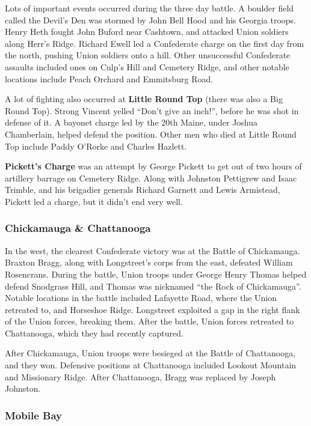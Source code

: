 Lots of important events occurred during the three day battle.
A boulder field called the Devil's Den was stormed by John Bell Hood and his Georgia troops.
Henry Heth fought John Buford near Cashtown, and attacked Union soldiers along Herr's Ridge.
Richard Ewell led a Confederate charge on the first day from the north, pushing Union soldiers onto a hill.
Other unsuccessful Confederate assaults included ones on Culp's Hill and Cemetery Ridge,
and other notable locations include Peach Orchard and Emmitsburg Road.

A lot of fighting also occurred at \textbf{Little Round Top} (there was also a Big Round Top).
Strong Vincent yelled ``Don't give an inch!'', before he was shot in defense of it.
A bayonet charge led by the 20th Maine, under Joshua Chamberlain, helped defend the position.
Other men who died at Little Round Top include Paddy O'Rorke and Charles Hazlett.

\textbf{Pickett's Charge} was an attempt by George Pickett
to get out of two hours of artillery barrage on Cemetery Ridge.
Along with Johnston Pettigrew and Isaac Trimble, and his brigadier generals Richard Garnett and Lewis Armistead,
Pickett led a charge, but it didn't end very well.

\subsubsection*{Chickamauga \& Chattanooga}

In the west, the clearest Confederate victory was at the Battle of Chickamauga.
Braxton Bragg, along with Longstreet's corps from the east, defeated William Rosencrans.
During the battle, Union troops under George Henry Thomas helped defend Snodgrass Hill,
and Thomas was nicknamed ``the Rock of Chickamauga''.
Notable locations in the battle included Lafayette Road, where the Union retreated to, and Horseshoe Ridge.
Longstreet exploited a gap in the right flank of the Union forces, breaking them.
After the battle, Union forces retreated to Chattanooga, which they had recently captured.

After Chickamauga, Union troops were besieged at the Battle of Chattanooga, and they won.
Defensive positions at Chattanooga included Lookout Mountain and Missionary Ridge.
After Chattanooga, Bragg was replaced by Joseph Johnston.

\subsubsection*{Mobile Bay}

